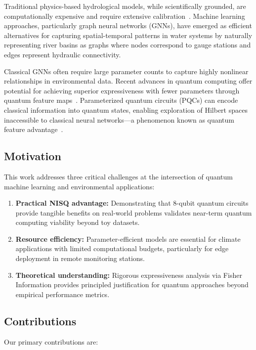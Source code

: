 \documentclass[conference]{IEEEtran}
\begin{document}
Traditional physics-based hydrological models, while scientifically grounded, are computationally expensive and require extensive calibration~\cite{b7}. Machine learning approaches, particularly graph neural networks (GNNs), have emerged as efficient alternatives for capturing spatial-temporal patterns in water systems by naturally representing river basins as graphs where nodes correspond to gauge stations and edges represent hydraulic connectivity.

Classical GNNs often require large parameter counts to capture highly nonlinear relationships in environmental data. Recent advances in quantum computing offer potential for achieving superior expressiveness with fewer parameters through quantum feature maps~\cite{b3}. Parameterized quantum circuits (PQCs) can encode classical information into quantum states, enabling exploration of Hilbert spaces inaccessible to classical neural networks---a phenomenon known as quantum feature advantage~\cite{b8}.

\subsection{Motivation}

This work addresses three critical challenges at the intersection of quantum machine learning and environmental applications:

\begin{enumerate}
\item \textbf{Practical NISQ advantage:} Demonstrating that 8-qubit quantum circuits provide tangible benefits on real-world problems validates near-term quantum computing viability beyond toy datasets.
\item \textbf{Resource efficiency:} Parameter-efficient models are essential for climate applications with limited computational budgets, particularly for edge deployment in remote monitoring stations.
\item \textbf{Theoretical understanding:} Rigorous expressiveness analysis via Fisher Information provides principled justification for quantum approaches beyond empirical performance metrics.
\end{enumerate}

\subsection{Contributions}

Our primary contributions are:
\end{document}
